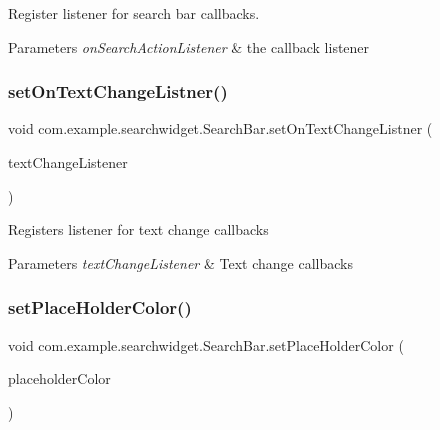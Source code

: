Register listener for search bar callbacks.


\begin{DoxyParams}{Parameters}
{\em on\+Search\+Action\+Listener} & the callback listener \\
\hline
\end{DoxyParams}
\mbox{\label{classcom_1_1example_1_1searchwidget_1_1_search_bar_afe1c0fa7bdb6574a8c22229de073fa2f}} 
\subsubsection{\texorpdfstring{setOnTextChangeListner()}{setOnTextChangeListner()}}
{\footnotesize\ttfamily void com.\+example.\+searchwidget.\+Search\+Bar.\+set\+On\+Text\+Change\+Listner (\begin{DoxyParamCaption}\item[{\mbox{\hyperlink{interfacecom_1_1example_1_1searchwidget_1_1_search_bar_1_1_text_change_listener}{Text\+Change\+Listener}}}]{text\+Change\+Listener }\end{DoxyParamCaption})}

Registers listener for text change callbacks 
\begin{DoxyParams}{Parameters}
{\em text\+Change\+Listener} & Text change callbacks \\
\hline
\end{DoxyParams}
\mbox{\label{classcom_1_1example_1_1searchwidget_1_1_search_bar_aa27cf7d4a9e11d4b452a7be85c15e9e6}} 
\subsubsection{\texorpdfstring{setPlaceHolderColor()}{setPlaceHolderColor()}}
{\footnotesize\ttfamily void com.\+example.\+searchwidget.\+Search\+Bar.\+set\+Place\+Holder\+Color (\begin{DoxyParamCaption}\item[{int}]{placeholder\+Color }\end{DoxyParamCaption})}

